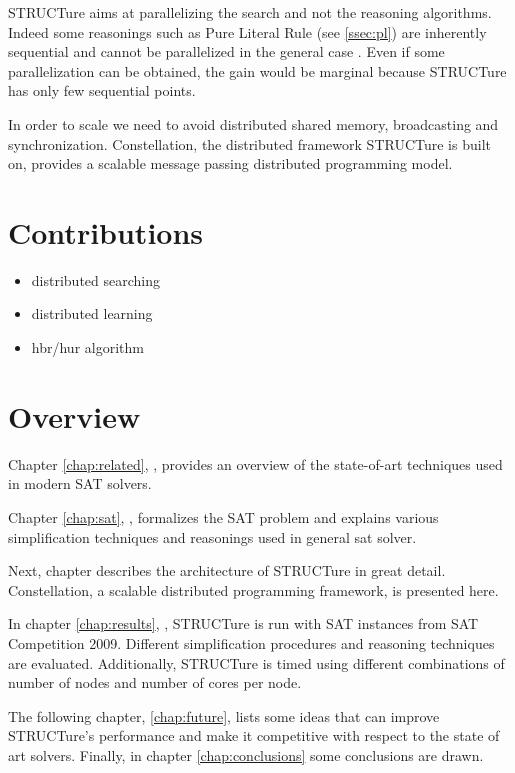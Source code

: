 STRUCTure aims at parallelizing the search and not the reasoning
algorithms. Indeed some reasonings such as Pure Literal Rule (see
\ref{ssec:pl}) are inherently sequential and cannot be parallelized
in the general case \cite{Johannsen:2005:CPL:1166822.1166834}. Even
if some parallelization can be obtained, the gain would be marginal
because STRUCTure has only few sequential points.

In order to scale we need to avoid distributed shared memory,
broadcasting and synchronization. Constellation, the distributed
framework STRUCTure is built on, provides a scalable message passing
distributed programming model.

\section{Contributions}

\begin{itemize}
  \item distributed searching
  \item distributed learning
  \item hbr/hur algorithm
\end{itemize}

\section{Overview}

Chapter \ref{chap:related}, , provides an
overview of the state-of-art techniques used in modern SAT solvers.

Chapter \ref{chap:sat}, ,
formalizes the SAT problem and explains various simplification
techniques and reasonings used in general sat solver.

Next, chapter  describes the
architecture of STRUCTure in great detail. Constellation, a scalable
distributed programming framework, is presented here.

In chapter \ref{chap:results}, , STRUCTure
is run with SAT instances from SAT Competition 2009. Different
simplification procedures and reasoning techniques are evaluated.
Additionally, STRUCTure is timed using different combinations of
number of nodes and number of cores per node.

The following chapter, \ref{chap:future}, lists some ideas that can
improve STRUCTure's performance and make it competitive with respect
to the state of art solvers. Finally, in chapter \ref{chap:conclusions}
some conclusions are drawn.
